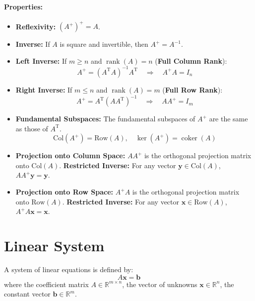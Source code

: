 \documentclass{article}
\begin{document}
\paragraph{Properties:}
\begin{itemize}
    \item \textbf{Reflexivity:} $(A^+)^+ = A$.

    \item \textbf{Inverse:} If $A$ is square and invertible, then $A^+ = A^{-1}$.

    \item \textbf{Left Inverse:} If $m \ge n$ and $\operatorname{rank}(A) = n$ (\textbf{Full Column Rank}):
    \[
        A^+ = (A^{\mathrm{T}} A)^{-1} A^{\mathrm{T}} \quad \Rightarrow \quad A^+ A = I_n
    \]

    \item \textbf{Right Inverse:} If $m \le n$ and $\operatorname{rank}(A) = m$ (\textbf{Full Row Rank}):
    \[
        A^+ = A^{\mathrm{T}} (A A^{\mathrm{T}})^{-1} \quad \Rightarrow \quad A A^+ = I_m
    \]

    \item \textbf{Fundamental Subspaces:} The fundamental subspaces of $A^+$ are the same as those of $A^{\mathrm{T}}$.
    \[
        \text{Col}(A^+) = \text{Row}(A), \quad \ker(A^+) = \operatorname{coker}(A)
    \]


    \item \textbf{Projection onto Column Space:} $A A^+$ is the orthogonal projection matrix onto $\text{Col}(A)$.
    \newline
    \textbf{Restricted Inverse:} For any vector $\mathbf{y} \in \text{Col}(A)$, $A A^+ \mathbf{y} = \mathbf{y}$.

    \item \textbf{Projection onto Row Space:} $A^+ A$ is the orthogonal projection matrix onto $\text{Row}(A)$.
    \newline
    \textbf{Restricted Inverse:} For any vector $\mathbf{x} \in \text{Row}(A)$, $A^+ A \mathbf{x} = \mathbf{x}$.
\end{itemize}


\newpage
\section{Linear System}

A system of linear equations is defined by:
\[
    A\mathbf{x} = \mathbf{b}
\]
where the coefficient matrix $A \in \mathbb{R}^{m \times n}$, the vector of unknowns $\mathbf{x} \in \mathbb{R}^n$, the constant vector $\mathbf{b} \in \mathbb{R}^m$.
\end{document}

